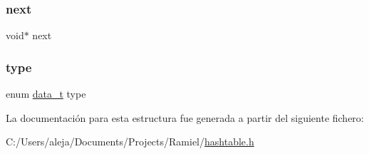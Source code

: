 \mbox{\label{structht__item_a75b19ffcca77bfc647ff02695958fd95}} 
\subsubsection{\texorpdfstring{next}{next}}
{\footnotesize\ttfamily void$\ast$ next}

\mbox{\label{structht__item_a0c6169f5c94682132bbbe974784559e6}} 
\subsubsection{\texorpdfstring{type}{type}}
{\footnotesize\ttfamily enum \mbox{\hyperlink{hashtable_8h_adb5f3584b941a8dc0fed6b7302b4b8eb}{data\+\_\+t}} type}



La documentación para esta estructura fue generada a partir del siguiente fichero\+:\begin{DoxyCompactItemize}
\item 
C\+:/\+Users/aleja/\+Documents/\+Projects/\+Ramiel/\mbox{\hyperlink{hashtable_8h}{hashtable.\+h}}\end{DoxyCompactItemize}
